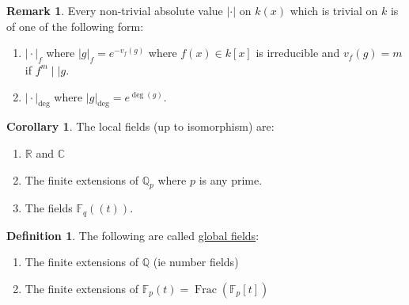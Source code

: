 \documentclass[openany]{amsbook}
\numberwithin{section}{chapter}
\theoremstyle{definition}
\newtheorem*{definition}{Definition}
\newtheorem*{remark}{Remark}
\newtheorem{corollary}[theorem]{Corollary}
\begin{document}
\begin{remark}
    Every non-trivial absolute value \(\vert \cdot \vert\) on \(k(x)\) which is trivial on \(k\) is of one of the following form:

    \begin{enumerate}[label=\roman*)]
        \item \(\vert \cdot \vert_f\) where \(\vert g \vert _f = e^{-v_f(g)}\) where \(f(x)\in k[x]\) is irreducible and \(v_f(g) = m\) if \(f^m \mid \mid g\).
        \item \(\vert \cdot \vert_{\operatorname{deg}}\) where \(\vert g \vert_{\operatorname{deg}} = e^{\deg(g)}\).
        
        \begin{center}
        \end{center}

    \end{enumerate} 
\end{remark}

\begin{corollary}
    The local fields (up to isomorphism) are:

    \begin{enumerate}[label=\roman*)]
        \item \(\mathbb{R}\) and \(\mathbb{C}\) 
        \item The finite extensions of \(\mathbb{Q}_p\) where \(p\) is any prime.
        \item The fields \(\mathbb{F}_q((t))\). 
    \end{enumerate} 
\end{corollary}

\begin{definition}
    The following are called \underline{global fields}:

    \begin{enumerate}[label=\roman*)]
        \item The finite extensions of \(\mathbb{Q}\) (ie number fields)
        \item The finite extensions of \(\mathbb{F}_p(t) = \operatorname{Frac}(\mathbb{F}_p[t])\) 
    \end{enumerate} 
\end{definition}
\end{document}
